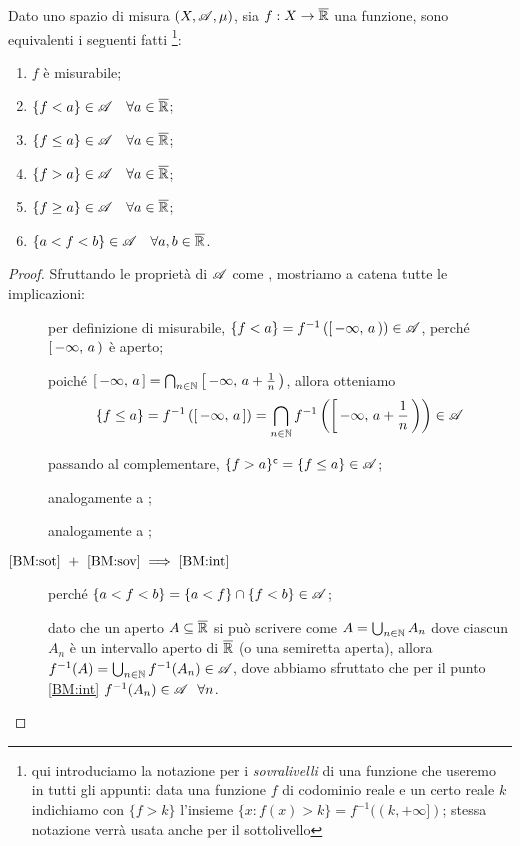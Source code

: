 \begin{proposition}\label{prop:BasicMis}
	Dato uno spazio di misura $(X,\mathscr A,\mu)$, sia $f:X\rightarrow \overline{\mathbb R}$ una funzione, sono equivalenti i seguenti fatti
	\footnote{qui introduciamo la notazione per i \textit{sovralivelli} di una funzione che useremo in tutti gli appunti:
		data una funzione $f$ di codominio reale e un certo reale $k$ indichiamo con $\{f>k\}$ l'insieme
		$\{x:f(x)>k\}=f^{-1}((k,+\infty])$; stessa notazione verrà usata anche per il sottolivello}:
	\begin{enumerate}[label=(\arabic*),ref=(\arabic*)]
		\item $f$ è misurabile; \label{BM:mis}
		\item $\{f<a\}\in \mathscr A \quad \forall a\in \overline{\mathbb R}$; \label{BM:sot}
		\item $\{f\leq a\}\in \mathscr A \quad \forall a\in \overline{\mathbb R}$; \label{BM:soteq}
		\item $\{f>a\}\in \mathscr A \quad \forall a\in \overline{\mathbb R}$; \label{BM:sov}
		\item $\{f\geq a\}\in \mathscr A \quad \forall a\in \overline{\mathbb R}$;  \label{BM:soveq}
		\item $\{a<f<b\}\in \mathscr A \quad \forall a,b\in \overline{\mathbb R}$. \label{BM:int}
	\end{enumerate}
\end{proposition}
\begin{proof}
	Sfruttando le proprietà di $\mathscr A$ come \sigalg, mostriamo a catena tutte le implicazioni:
	\begin{description}
	\item[] per definizione di misurabile, $\{f<a\}=f^{-1}\left(\left[\,-\infty,\,a\,\right)\right)\in \mathscr A$,
		perché $\left[\,-\infty,\,a\,\right)$ è aperto;
	\item[] poiché $\left[\,-\infty,\,a\,\right]=\bigcap_{n\in \mathbb N}\left[\,-\infty,\,a+\frac{1}{n}\,\right)$, allora otteniamo
		\begin{equation*}
			\{f\leq a\}=f^{-1}\left(\left[\,-\infty,\,a\,\right]\right)=\bigcap_{n\in \mathbb N}f^{-1}\left(\left[\,-\infty,\,a+\frac{1}{n}\,\right)\right)\in \mathscr A	
		\end{equation*}

	\item[] passando al complementare, $\{f>a\}^\mathsf{c}=\{f\leq a\}\in \mathscr A$;
	\item[] analogamente a ; 
	\item[] analogamente a ;
	\item[$\text{\ref{BM:sot}}\ +\ \text{\ref{BM:sov}}\implies\text{\ref{BM:int}}$] perché
		$\{a<f<b\}=\{a<f\}\cap\{f<b\}\in \mathscr A$;
	\item[] dato che un aperto $A\subseteq\overline{\mathbb R}$ si può scrivere come
		$A=\bigcup_{n\in \mathbb N}A_n$ dove ciascun $A_n$ è un intervallo aperto di $\overline{\mathbb R}$ (o una semiretta aperta),
		allora $f^{-1}(A)=\bigcup_{n\in \mathbb N}f^{-1}(A_n)\in \mathscr A$, dove abbiamo sfruttato che per il punto \ref{BM:int} $f^{-1}(A_n)\in \mathscr A\ \ \forall n$.
	\end{description}
\end{proof}

